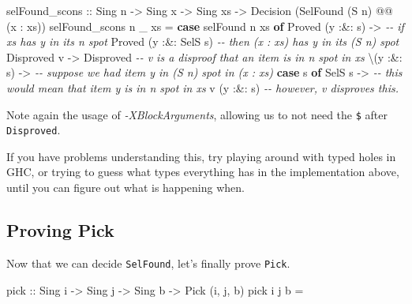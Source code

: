 \documentclass[]{article}
\newenvironment{Shaded}{}{}
\newcommand{\CommentTok}[1]{\textcolor[rgb]{0.38,0.63,0.69}{\textit{#1}}}
\newcommand{\DataTypeTok}[1]{\textcolor[rgb]{0.56,0.13,0.00}{#1}}
\newcommand{\KeywordTok}[1]{\textcolor[rgb]{0.00,0.44,0.13}{\textbf{#1}}}
\newcommand{\NormalTok}[1]{#1}
\newcommand{\OperatorTok}[1]{\textcolor[rgb]{0.40,0.40,0.40}{#1}}
\newcommand{\OtherTok}[1]{\textcolor[rgb]{0.00,0.44,0.13}{#1}}
\begin{document}
\begin{enumerate}
\begin{Shaded}
\begin{Highlighting}[]
\NormalTok{selFound\_scons}
\OtherTok{    ::} \DataTypeTok{Sing}\NormalTok{ n}
    \OtherTok{{-}>} \DataTypeTok{Sing}\NormalTok{ x}
    \OtherTok{{-}>} \DataTypeTok{Sing}\NormalTok{ xs}
    \OtherTok{{-}>} \DataTypeTok{Decision}\NormalTok{ (}\DataTypeTok{SelFound}\NormalTok{ (}\DataTypeTok{\textquotesingle{}S}\NormalTok{ n) }\OperatorTok{@@}\NormalTok{ (x \textquotesingle{}}\OperatorTok{:}\NormalTok{ xs))}
\NormalTok{selFound\_scons n \_ xs }\OtherTok{=} \KeywordTok{case}\NormalTok{ selFound n xs }\KeywordTok{of}
    \DataTypeTok{Proved}\NormalTok{ (y }\OperatorTok{:\&:}\NormalTok{ s) }\OtherTok{{-}>}       \CommentTok{{-}{-} if xs has y in its n spot}
      \DataTypeTok{Proved}\NormalTok{ (y }\OperatorTok{:\&:} \DataTypeTok{SelS}\NormalTok{ s)   }\CommentTok{{-}{-} then (x : xs) has y in its (S n) spot}
    \DataTypeTok{Disproved}\NormalTok{ v      }\OtherTok{{-}>} \DataTypeTok{Disproved} \CommentTok{{-}{-} v is a disproof that an item is in n spot in xs}
\NormalTok{      \textbackslash{}(y }\OperatorTok{:\&:}\NormalTok{ s) }\OtherTok{{-}>}      \CommentTok{{-}{-} suppose we had item y in (S n) spot in (x : xs)}
        \KeywordTok{case}\NormalTok{ s }\KeywordTok{of}
          \DataTypeTok{SelS}\NormalTok{ s\textquotesingle{} }\OtherTok{{-}>}     \CommentTok{{-}{-} this would mean that item \textquotesingle{}y\textquotesingle{} is in \textquotesingle{}n\textquotesingle{} spot in xs}
\NormalTok{            v (y }\OperatorTok{:\&:}\NormalTok{ s\textquotesingle{}) }\CommentTok{{-}{-} however, v disproves this.}
\end{Highlighting}
\end{Shaded}

  Note again the usage of \emph{-XBlockArguments}, allowing us to not need the
  \texttt{\$} after \texttt{Disproved}.

  If you have problems understanding this, try playing around with typed holes
  in GHC, or trying to guess what types everything has in the implementation
  above, until you can figure out what is happening when.
\end{enumerate}

\hypertarget{proving-pick}{%
\subsection{Proving Pick}\label{proving-pick}}

Now that we can decide \texttt{SelFound}, let's finally prove \texttt{Pick}.

\begin{Shaded}
\begin{Highlighting}[]
\NormalTok{pick}
\OtherTok{    ::} \DataTypeTok{Sing}\NormalTok{ i}
    \OtherTok{{-}>} \DataTypeTok{Sing}\NormalTok{ j}
    \OtherTok{{-}>} \DataTypeTok{Sing}\NormalTok{ b}
    \OtherTok{{-}>} \DataTypeTok{Pick}\NormalTok{ \textquotesingle{}(i, j, b)}
\NormalTok{pick i j b }\OtherTok{=}
\end{Highlighting}
\end{Shaded}
\end{document}
